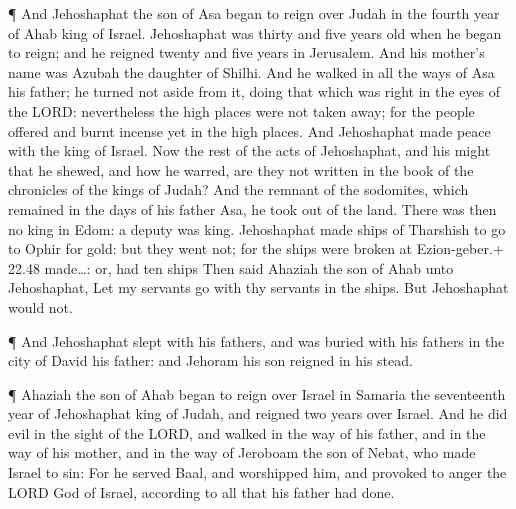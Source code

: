  ¶ And Jehoshaphat the son of Asa began to reign over Judah
in the fourth year of Ahab king of Israel.  Jehoshaphat was
thirty and five years old when he began to reign; and he reigned twenty
and five years in Jerusalem. And his mother's name was Azubah the
daughter of Shilhi.  And he walked in all the ways of Asa
his father; he turned not aside from it, doing that which was right in
the eyes of the LORD: nevertheless the high places were not taken away;
for the people offered and burnt incense yet in the high places.
 And Jehoshaphat made peace with the king of Israel.
 Now the rest of the acts of Jehoshaphat, and his might
that he shewed, and how he warred, are they not written in the book of
the chronicles of the kings of Judah?  And the remnant of
the sodomites, which remained in the days of his father Asa, he took out
of the land.  There was then no king in Edom: a deputy was
king.  Jehoshaphat made ships of Tharshish to go to Ophir
for gold: but they went not; for the ships were broken at Ezion-geber.+
22.48 made\ldots: or, had ten ships  Then said Ahaziah the
son of Ahab unto Jehoshaphat, Let my servants go with thy servants in
the ships. But Jehoshaphat would not.

 ¶ And Jehoshaphat slept with his fathers, and was buried
with his fathers in the city of David his father: and Jehoram his son
reigned in his stead.

 ¶ Ahaziah the son of Ahab began to reign over Israel in
Samaria the seventeenth year of Jehoshaphat king of Judah, and reigned
two years over Israel.  And he did evil in the sight of the
LORD, and walked in the way of his father, and in the way of his mother,
and in the way of Jeroboam the son of Nebat, who made Israel to sin:
 For he served Baal, and worshipped him, and provoked to
anger the LORD God of Israel, according to all that his father had done.
